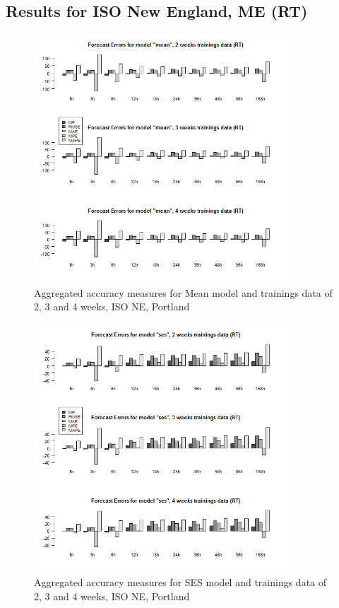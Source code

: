 \FloatBarrier
\subsection{Results for ISO New England, ME (RT)}




\begin{figure}[!ht]
	\centering
		\includegraphics[width=0.85\textwidth]{figures/appendix_forecast_results/rt_sim_4_x_1w_1w_mean.png}
	\caption{Aggregated accuracy measures for Mean model and trainings data of 2, 3 and 4 weeks, ISO NE, Portland}
	\label{fig:app_rt_sim_4_x_1w_1w_mean}
\end{figure}



\begin{figure}[!ht]
	\centering
	\vspace*{-1.2in}
		\includegraphics[width=0.85\textwidth]{figures/appendix_forecast_results/rt_sim_4_x_1w_1w_ses.png}
	\caption{Aggregated accuracy measures for SES model and trainings data of 2, 3 and 4 weeks, ISO NE, Portland}
	\label{fig:app_rt_sim_4_x_1w_1w_ses}
\end{figure}

